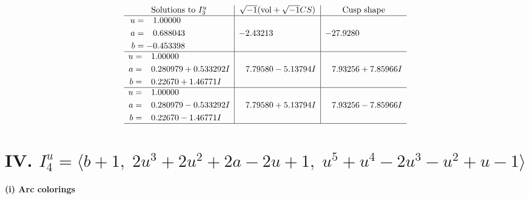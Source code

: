 \documentclass[1p]{elsarticle_modified}
\theoremstyle{definition}
\newcommand{\I}{\sqrt{-1}}
\begin{document}
$$\begin{array}{c|c|c}  
\text{Solutions to }I^u_{3}& \I (\text{vol} + \sqrt{-1}CS) & \text{Cusp shape}\\
 \hline 
\begin{aligned}
u &= \phantom{-}1.00000\phantom{ +0.000000I} \\
a &= \phantom{-}0.688043\phantom{ +0.000000I} \\
b &= -0.453398\phantom{ +0.000000I}\end{aligned}
 & -2.43213\phantom{ +0.000000I} & -27.9280\phantom{ +0.000000I} \\ \hline\begin{aligned}
u &= \phantom{-}1.00000\phantom{ +0.000000I} \\
a &= \phantom{-}0.280979 + 0.533292 I \\
b &= \phantom{-}0.22670 + 1.46771 I\end{aligned}
 & \phantom{-}7.79580 - 5.13794 I & \phantom{-}7.93256 + 7.85966 I \\ \hline\begin{aligned}
u &= \phantom{-}1.00000\phantom{ +0.000000I} \\
a &= \phantom{-}0.280979 - 0.533292 I \\
b &= \phantom{-}0.22670 - 1.46771 I\end{aligned}
 & \phantom{-}7.79580 + 5.13794 I & \phantom{-}7.93256 - 7.85966 I\\
 \hline 
 \end{array}$$\newpage\newpage\renewcommand{\arraystretch}{1}
\centering \section*{IV. $I^u_{4}= \langle b+1,\;2 u^3+2 u^2+2 a-2 u+1,\;u^5+u^4-2 u^3- u^2+u-1 \rangle$}
\flushleft \textbf{(i) Arc colorings}\\
\end{document}
